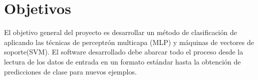 %
%
%
\section{Objetivos}
%
El objetivo general del proyecto es desarrollar un método de
clasificación de  aplicando las técnicas de
perceptrón multicapa (MLP) y máquinas de vectores de soporte(SVM).
El software desarrollado debe abarcar todo el proceso desde
la lectura de los datos de entrada en un formato estándar hasta la
obtención de predicciones de clase para nuevos ejemplos.

